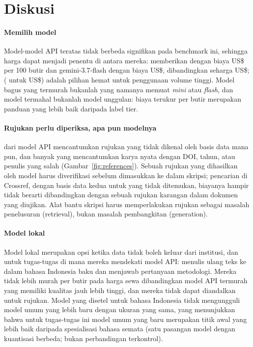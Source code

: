 \section{Diskusi}
\label{sec:discussion}

\paragraph{Memilih model} Model-model API teratas tidak berbeda signifikan pada benchmark ini, sehingga harga dapat menjadi penentu di antara mereka: \ThirdName{} memberikan \ScoreGptSixOneSol{} dengan biaya US\$\ThirdUSD{} per 100 butir dan gemini-3.7-flash \ScoreGeminiThreeSevenFlash{} dengan biaya US\$\UsdGeminiThreeSevenFlash{}, dibandingkan \TopScore{} seharga US\$\TopUSD{}; \CheapName{} (\CheapScore{} untuk US\$\CheapUSD{}) adalah pilihan hemat untuk penggunaan volume tinggi. Model bagus yang termurah bukanlah yang namanya memuat \emph{mini} atau \emph{flash}, dan model termahal bukanlah model unggulan: biaya terukur per butir merupakan panduan yang lebih baik daripada label tier.

\paragraph{Rujukan perlu diperiksa, apa pun modelnya} \NoneApiNonzero{} dari \NApi{} model API mencantumkan rujukan yang tidak dikenal oleh basis data mana pun, dan banyak yang mencantumkan karya nyata dengan DOI, tahun, atau penulis yang salah (Gambar~\ref{fig:references}). Sebuah rujukan yang dihasilkan oleh model harus diverifikasi sebelum dimasukkan ke dalam skripsi; pencarian di Crossref, dengan basis data kedua untuk yang tidak ditemukan, biayanya hampir tidak berarti dibandingkan dengan sebuah rujukan karangan dalam dokumen yang diujikan. Alat bantu skripsi harus memperlakukan rujukan sebagai masalah penelusuran (retrieval), bukan masalah pembangkitan (generation).

\paragraph{Model lokal} Model lokal merupakan opsi ketika data tidak boleh keluar dari institusi, dan untuk tugas-tugas di mana mereka mendekati model API: menulis ulang teks ke dalam bahasa Indonesia baku dan menjawab pertanyaan metodologi. Mereka tidak lebih murah per butir pada harga sewa dibandingkan model API termurah yang memiliki kualitas jauh lebih tinggi, dan mereka tidak dapat diandalkan untuk rujukan. Model yang disetel untuk bahasa Indonesia tidak mengungguli model umum yang lebih baru dengan ukuran yang sama, yang menunjukkan bahwa untuk tugas-tugas ini model umum yang baru merupakan titik awal yang lebih baik daripada spesialisasi bahasa semata (satu pasangan model dengan kuantisasi berbeda; bukan perbandingan terkontrol).

